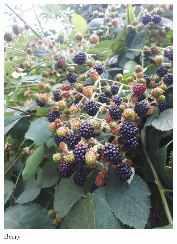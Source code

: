 \begin{figure}
\begin{subfigure}{0.48\textwidth}
    \includegraphics[width=\textwidth]{rubus/armeniacus_berry_01}
    \caption{Berry}
    \label{fig:rub:armeniacus:berry}
\end{subfigure}
\hfill
\begin{subfigure}{0.48\textwidth}

\end{subfigure}
\end{figure}
